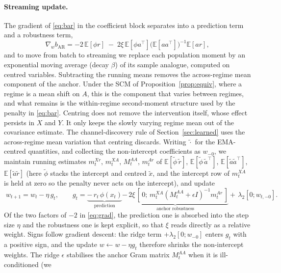 \documentclass[12pt]{article}
\theoremstyle{plain}
\theoremstyle{remark}
\newcommand{\E}{\mathbb{E}}
\begin{document}
\paragraph{Streaming update.}
The gradient of \eqref{eq:bar} in the coefficient block separates into a prediction
term and a robustness term,
\begin{equation}\label{eq:grad}
\nabla_w b_{\mathrm{AR}} = -2\,\E[\phi r]
 \;-\;2\xi\,\E[\phi a^\top]\big(\E[aa^\top]\big)^{-1}\E[a r],
\end{equation}
and to move from batch to streaming we replace each population moment by an exponential
moving average (decay $\beta$) of its sample analogue, computed on centred variables.
Subtracting the running means removes the across-regime mean component of the anchor.
Under the SCM of Proposition~\ref{prop:equiv}, where a regime is a mean shift on $A$,
this is the component that varies between regimes, and what remains is the
within-regime second-moment structure used by the penalty in \eqref{eq:bar}.
Centring does not remove the intervention itself, whose effect persists in $X$ and
$Y$. It only keeps the slowly varying regime mean out of the covariance estimate. The
channel-discovery rule of Section~\ref{sec:learned} uses the across-regime mean
variation that centring discards. Writing $\tilde\cdot$ for the EMA-centred quantities, and
collecting the non-intercept coefficients as $w_{-0}$, we maintain running estimates
$m^{Xr}_t$, $m^{XA}_t$, $M^{AA}_t$, $m^{Ar}_t$ of
$\E[\tilde\phi\,\tilde r]$, $\E[\tilde\phi\,\tilde a^\top]$,
$\E[\tilde a\tilde a^\top]$, $\E[\tilde a\tilde r]$ (here $\tilde\phi$ stacks the
intercept and centred $\tilde x$, and the intercept row of $m^{XA}_t$ is held at
zero so the penalty never acts on the intercept), and update
\begin{equation}\label{eq:update}
\boxed{\;w_{t+1}=w_t-\eta\,g_t,\qquad
 g_t=\underbrace{-\,r_t\,\phi(x_t)}_{\text{prediction}}
 \underbrace{-\,2\xi\,[\,0;\,m^{XA}_t(M^{AA}_t+\epsilon I)^{-1}m^{Ar}_t\,]}_{\text{anchor robustness}}
 +\,\lambda_2[0;w_{t,-0}].\;}
\end{equation}
Of the two factors of $-2$ in \eqref{eq:grad}, the prediction one is absorbed into
the step size $\eta$ and the robustness one is kept explicit, so that $\xi$ reads
directly as a relative weight. Signs follow gradient descent: the ridge term
$+\lambda_2[0;w_{-0}]$ enters $g_t$ with a positive sign, and the update
$w\!\leftarrow\!w-\eta g_t$ therefore shrinks the non-intercept weights. The ridge
$\epsilon$ stabilises the anchor Gram matrix $M^{AA}_t$ when it is ill-conditioned (we
\end{document}
